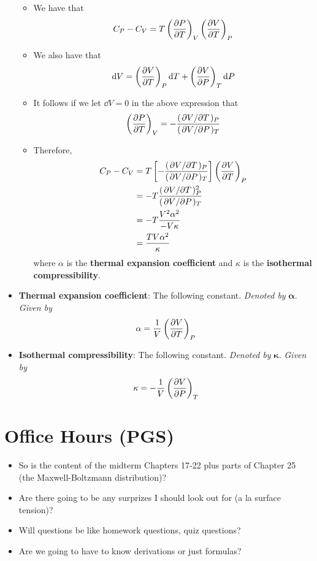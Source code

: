 \documentclass[../notes.tex]{subfiles}
\begin{document}
\begin{itemize}
\begin{itemize}
        \item We have that
        \begin{equation*}
            C_P-C_V = T\left( \pdv{P}{T} \right)_V\left( \pdv{V}{T} \right)_P
        \end{equation*}
        \item We also have that
        \begin{equation*}
            \dd{V} = \left( \pdv{V}{T} \right)_P\dd{T}+\left( \pdv{V}{P} \right)_T\dd{P}
        \end{equation*}
        \item It follows if we let $\dd{V}=0$ in the above expression that
        \begin{equation*}
            \left( \pdv{P}{T} \right)_V = -\frac{(\pdv*{V}{T})_P}{(\pdv*{V}{P})_T}
        \end{equation*}
        \item Therefore,
        \begin{align*}
            C_P-C_V &= T\left[ -\frac{(\pdv*{V}{T})_P}{(\pdv*{V}{P})_T} \right]\left( \pdv{V}{T} \right)_P\\
            &= -T\frac{(\pdv*{V}{T})_P^2}{(\pdv*{V}{P})_T}\\
            &= -T\frac{V^2\alpha^2}{-V\kappa}\\
            &= \frac{TV\alpha^2}{\kappa}
        \end{align*}
        where $\alpha$ is the \textbf{thermal expansion coefficient} and $\kappa$ is the \textbf{isothermal compressibility}.
    \end{itemize}
    \item \textbf{Thermal expansion coefficient}: The following constant. \emph{Denoted by} $\bm{\alpha}$. \emph{Given by}
    \begin{equation*}
        \alpha = \frac{1}{V}\left( \pdv{V}{T} \right)_P
    \end{equation*}
    \item \textbf{Isothermal compressibility}: The following constant. \emph{Denoted by} $\bm{\kappa}$. \emph{Given by}
    \begin{equation*}
        \kappa = -\frac{1}{V}\left( \pdv{V}{P} \right)_T
    \end{equation*}
\end{itemize}



\section{Office Hours (PGS)}
\begin{itemize}
    \item So is the content of the midterm Chapters 17-22 plus parts of Chapter 25 (the Maxwell-Boltzmann distribution)?
    \item Are there going to be any surprizes I should look out for (a la surface tension)?
    \item Will questions be like homework questions, quiz questions?
    \item Are we going to have to know derivations or just formulas?
\end{itemize}
\end{document}
